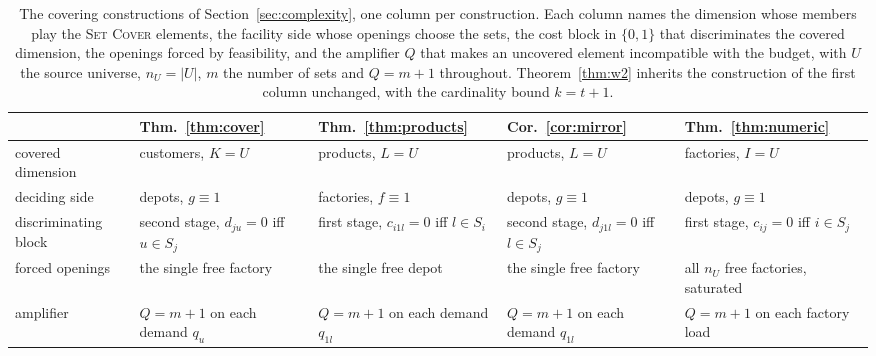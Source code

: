 \begin{table}[H]
\small
\centering
\caption{The covering constructions of Section~\ref{sec:complexity},
one column per construction. Each column names the dimension whose
members play the \textsc{Set Cover} elements, the facility side whose
openings choose the sets, the cost block in $\{0,1\}$ that
discriminates the covered dimension, the openings forced by
feasibility, and the amplifier $Q$ that makes an uncovered element
incompatible with the budget, with $U$ the source universe, $n_U=|U|$,
$m$ the number of sets and $Q=m+1$ throughout. Theorem~\ref{thm:w2} inherits the
construction of the first column unchanged, with the cardinality bound
$k=t+1$.}
\label{tab:reductions}
\setlength{\tabcolsep}{5pt}
\begin{tabular}{@{}>{\raggedright\arraybackslash}p{2.6cm}
  >{\raggedright\arraybackslash}p{2.25cm}
  >{\raggedright\arraybackslash}p{2.25cm}
  >{\raggedright\arraybackslash}p{2.25cm}
  >{\raggedright\arraybackslash}p{2.45cm}@{}}
\toprule
 & Thm.~\ref{thm:cover} & Thm.~\ref{thm:products} &
Cor.~\ref{cor:mirror} & Thm.~\ref{thm:numeric}\\
\midrule
covered dimension & customers, $K=U$ & products, $L=U$ &
products, $L=U$ & factories, $I=U$\\[2pt]
deciding side & depots, $g\equiv 1$ & factories, $f\equiv 1$ &
depots, $g\equiv 1$ & depots, $g\equiv 1$\\[2pt]
discriminating block & second stage, $d_{ju}=0$ iff $u\in S_j$ &
first stage, $c_{i1l}=0$ iff $l\in S_i$ &
second stage, $d_{j1l}=0$ iff $l\in S_j$ &
first stage, $c_{ij}=0$ iff $i\in S_j$\\[2pt]
forced openings & the single free factory & the single free depot &
the single free factory & all $n_U$ free factories, saturated\\[2pt]
amplifier & $Q=m+1$ on each demand $q_u$ &
$Q=m+1$ on each demand $q_{1l}$ & $Q=m+1$ on each demand $q_{1l}$ &
$Q=m+1$ on each factory load\\
\bottomrule
\end{tabular}
\end{table}
